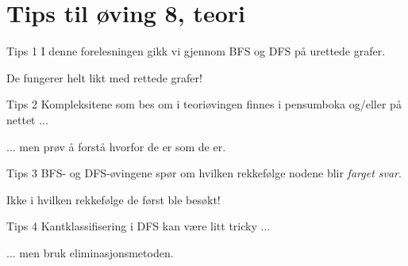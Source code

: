\documentclass[14pt]{beamer}
\begin{document}
\section{Tips til øving 8, teori}
\begin{frame}{Tips 1}
    I denne forelesningen gikk vi gjennom BFS og DFS på urettede grafer.

    \pause

    De fungerer helt likt med rettede grafer!
\end{frame}
\begin{frame}{Tips 2}
    Kompleksitene som bes om i teoriøvingen finnes i pensumboka og/eller på nettet ...

    \pause

    ... men prøv å forstå hvorfor de er som de er.
\end{frame}
\begin{frame}{Tips 3}
    BFS- og DFS-øvingene spør om hvilken rekkefølge nodene blir \textit{farget svar}.

    \pause

    Ikke i hvilken rekkefølge de først ble besøkt!
\end{frame}
\begin{frame}{Tips 4}
    Kantklassifisering i DFS kan være litt tricky ...

    \pause

    ... men bruk eliminasjonsmetoden.
\end{frame}
\end{document}
